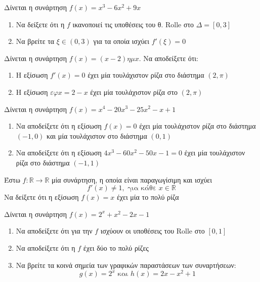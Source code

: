 \documentclass{presentation}
\begin{document}
\begin{askisi}
  Δίνεται η συνάρτηση $f(x)=x^3-6x^2+9x$
  \begin{enumerate}
    \item<1-> Να δείξετε ότι η $f$ ικανοποιεί τις υποθέσεις του θ. Rolle στο $Δ=[0,3]$
    \item<2-> Να βρείτε τα $ξ\in(0,3)$ για τα οποία ισχύει $f'(ξ)=0$
  \end{enumerate}
\end{askisi}

\begin{askisi}
  Δίνεται η συνάρτηση $f(x)=(x-2)ημx$. Να αποδείξετε ότι:
  \begin{enumerate}
    \item<1-> Η εξίσωση $f'(x)=0$ έχει μία τουλάχιστον ρίζα στο διάστημα $(2,π)$
    \item<2-> Η εξίσωση $εφx=2-x$ έχει μία τουλάχιστον ρίζα στο $(2,π)$
  \end{enumerate}

\end{askisi}

\begin{askisi}
  Δίνεται η συνάρτηση $f(x)=x^4-20x^3-25x^2-x+1$
  \begin{enumerate}
    \item<1-> Να αποδείξετε ότι η εξίσωση $f(x)=0$ έχει μία τουλάχιστον ρίζα στο διάστημα $(-1,0)$ και μία τουλάχιστον στο διάστημα $(0,1)$
    \item<2-> Να αποδείξετε ότι η εξίσωση $4x^3-60x^2-50x-1=0$ έχει μία τουλάχιστον ρίζα στο διάστημα $(-1,1)$
  \end{enumerate}
\end{askisi}

\begin{askisi}
  Έστω $f:\mathbb{R}\to\mathbb{R}$ μία συνάρτηση, η οποία είναι παραγωγίσιμη και ισχύει
  $$f'(x)\ne 1, \text{ για κάθε } x\in\mathbb{R}$$
  Να δείξετε ότι η εξίσωση $f(x)=x$ έχει μία το πολύ ρίζα
\end{askisi}

\begin{askisi}
  Δίνεται η συνάρτηση $f(x)=2^x+x^2-2x-1$
  \begin{enumerate}
    \item<1-> Να αποδείξετε ότι για την $f$ ισχύουν οι υποθέσεις του Rolle στο $[0,1]$
    \item<2-> Να αποδείξετε ότι η $f$ έχει δύο το πολύ ρίζες
    \item<3-> Να βρείτε τα κοινά σημεία των γραφικών παραστάσεων των συναρτήσεων:
          $$g(x)=2^x \text{ και } h(x)=2x-x^2+1$$
  \end{enumerate}
\end{askisi}
\end{document}
